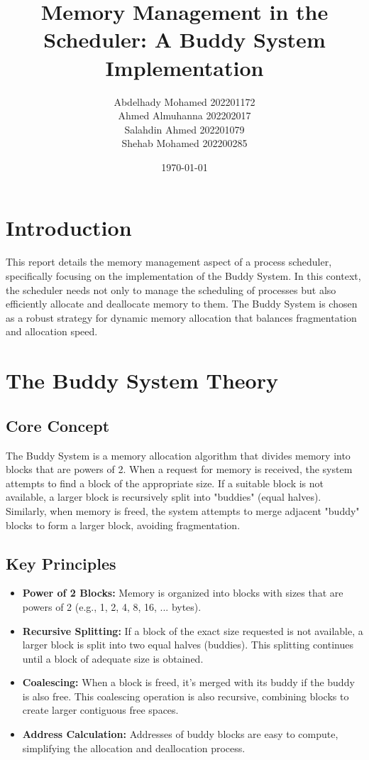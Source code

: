 \documentclass{article}
\title{Memory Management in the Scheduler: A Buddy System Implementation}
\author{
  Abdelhady Mohamed                            202201172 \\
  Ahmed Almuhanna                                202202017 \\
  Salahdin Ahmed                                      202201079 \\
  Shehab Mohamed                                  202200285 \\
}
\date{\today}
\begin{document}
\maketitle

\section{Introduction}

This report details the memory management aspect of a process scheduler, specifically focusing on the implementation of the Buddy System. In this context, the scheduler needs not only to manage the scheduling of processes but also efficiently allocate and deallocate memory to them. The Buddy System is chosen as a robust strategy for dynamic memory allocation that balances fragmentation and allocation speed.

\section{The Buddy System Theory}

\subsection{Core Concept}
The Buddy System is a memory allocation algorithm that divides memory into blocks that are powers of 2. When a request for memory is received, the system attempts to find a block of the appropriate size. If a suitable block is not available, a larger block is recursively split into "buddies" (equal halves). Similarly, when memory is freed, the system attempts to merge adjacent "buddy" blocks to form a larger block, avoiding fragmentation.

\subsection{Key Principles}

\begin{itemize}
    \item \textbf{Power of 2 Blocks:} Memory is organized into blocks with sizes that are powers of 2 (e.g., 1, 2, 4, 8, 16, ... bytes).
    \item \textbf{Recursive Splitting:} If a block of the exact size requested is not available, a larger block is split into two equal halves (buddies). This splitting continues until a block of adequate size is obtained.
    \item \textbf{Coalescing:} When a block is freed, it's merged with its buddy if the buddy is also free. This coalescing operation is also recursive, combining blocks to create larger contiguous free spaces.
    \item \textbf{Address Calculation:} Addresses of buddy blocks are easy to compute, simplifying the allocation and deallocation process.
\end{itemize}
\end{document}
